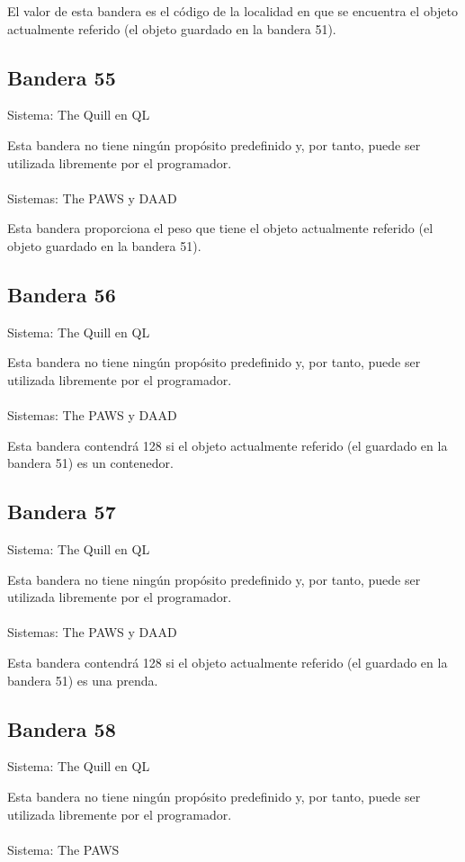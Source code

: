 \documentclass[11pt, a5paper]{article}
\newcommand{\quill}{\textsf{The Quill}\xspace}
\newcommand{\paw}{\textsf{The PAWS}\xspace}
\newcommand{\daad}{\textsf{DAAD}\xspace}
\newcommand{\sistema}[1]{\noindent Sistema: #1 \nopagebreak}
\newcommand{\sistemas}[1]{\noindent Sistemas: #1 \nopagebreak}
\begin{document}
El valor de esta bandera es el código de la localidad en que se encuentra el objeto actualmente referido (el objeto guardado en la bandera 51).

\subsection{Bandera 55}

\sistema{\quill en QL}

Esta bandera no tiene ningún propósito predefinido y, por tanto, puede ser utilizada libremente por el programador.
\\\ \\
\sistemas{\paw y \daad}

Esta bandera proporciona el peso que tiene el objeto actualmente referido (el objeto guardado en la bandera 51).

\subsection{Bandera 56}

\sistema{\quill en QL}

Esta bandera no tiene ningún propósito predefinido y, por tanto, puede ser utilizada libremente por el programador.
\\\ \\
\sistemas{\paw y \daad}

Esta bandera contendrá 128 si el objeto actualmente referido (el guardado en la bandera 51) es un contenedor.

\subsection{Bandera 57}

\sistema{\quill en QL}

Esta bandera no tiene ningún propósito predefinido y, por tanto, puede ser utilizada libremente por el programador.
\\\ \\
\sistemas{\paw y \daad}

Esta bandera contendrá 128 si el objeto actualmente referido (el guardado en la bandera 51) es una prenda.

\subsection{Bandera 58}

\sistema{\quill en QL}

Esta bandera no tiene ningún propósito predefinido y, por tanto, puede ser utilizada libremente por el programador.
\\\ \\
\sistema{\paw}
\end{document}
